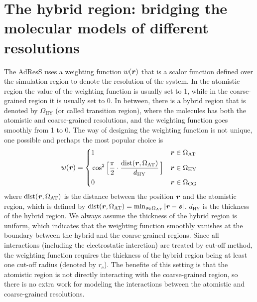 \documentclass[epjST]{svjour}
\newcommand{\vect}[1]{\textbf{\textit{#1}}}
\newcommand{\dist}[0]{\textrm {dist}}
\newcommand{\AT}[0]{\textrm{AT}}
\newcommand{\HY}[0]{\textrm{HY}}
\newcommand{\CG}[0]{\textrm{CG}}
\begin{document}
\section{The hybrid region: bridging the molecular models of different resolutions}
\label{sec:design}
The AdResS uses a weighting function $w(\vect r)$ that is a scalor
function defined over the simulation region to denote the resolution
of the system. In the atomistic region the value of the
weighting function is usually set to 1, while in the coarse-grained
region it is usually set to 0. In between, there is a bybrid region
that is denoted by $\Omega_\HY$
(or called transition region), where the molecules
has both the atomistic and coarse-grained resolutions, and the weighting function
goes smoothly from 1 to 0. The way of designing the weighting function
is not unique, one possible and perhaps the most popular choice is
\begin{equation}\label{eqn:old-w}
  w(\vect r) =
  \left\{
    \begin{alignedat}{3}
      &1 &\quad& \vect r \in \Omega_\AT\\
      &\cos^2\Big[\frac{\pi}{2 } \cdot \frac{\dist(\vect r, \Omega_\AT)}{d_\HY}\,\Big] && \vect r \in\Omega_\HY \\
      &0 &    & \vect r \in \Omega_\CG 
    \end{alignedat}
  \right.
\end{equation}
where $\dist(\vect r, \Omega_\AT)$ is the distance between the
position $\vect r$ and the atomistic region, which is defined
by $\dist(\vect r, \Omega_\AT) = \min_{\vect s\in\Omega_\AT} \vert
\vect r - \vect s \vert$.  $d_\HY$ is the thickness of the hybrid
region. We always assume the thickness of the hybrid region is
uniform, which indicates that the weighting function smoothly vanishes
at the boundary between the hybrid and the coarse-grained regions.
Since all interactions (including the electrostatic interction) are treated
by cut-off method, the weighting function requires the thickness of
the hybrid region being at least one cut-off radius (denoted by $r_c$). 
The benefite of this setting is that the atomistic
region is not directly interacting with the coarse-grained region,
so there is no extra work for modeling the interactions between the atomistic
and coarse-grained resolutions.
\end{document}
